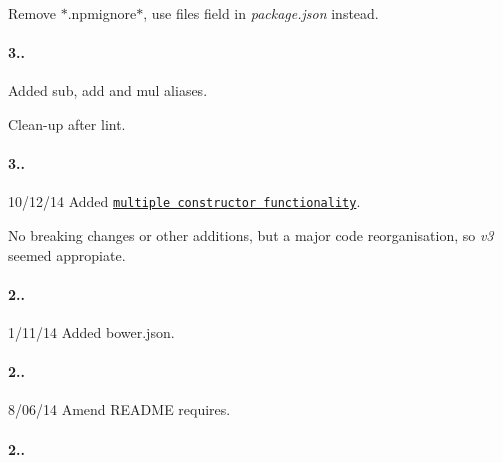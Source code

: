 \begin{DoxyItemize}
\item Remove $\ast$.npmignore$\ast$, use {\ttfamily files} field in {\itshape package.\+json} instead.
\end{DoxyItemize}

\paragraph*{3..}


\begin{DoxyItemize}
\item Added {\ttfamily sub}, {\ttfamily add} and {\ttfamily mul} aliases.
\item Clean-\/up after lint.
\end{DoxyItemize}

\paragraph*{3..}


\begin{DoxyItemize}
\item 10/12/14 Added \href{http://mikemcl.github.io/big.js/#faq}{\tt multiple constructor functionality}.
\item No breaking changes or other additions, but a major code reorganisation, so {\itshape v3} seemed appropiate.
\end{DoxyItemize}

\paragraph*{2..}


\begin{DoxyItemize}
\item 1/11/14 Added bower.\+json.
\end{DoxyItemize}

\paragraph*{2..}


\begin{DoxyItemize}
\item 8/06/14 Amend R\+E\+A\+D\+ME requires.
\end{DoxyItemize}

\paragraph*{2..}


